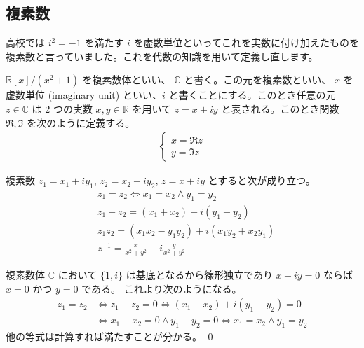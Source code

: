 \documentclass[uplatex,dvipdfmx,a4paper,11pt]{jlreq}
\makeatletter
\newcommand{\CC}{\mathbb{C}}
\newcommand{\RR}{\mathbb{R}}
\theoremstyle{definition}
\renewenvironment{proof}[1][\proofname]{\par
  \normalfont
  \topsep6\p@\@plus6\p@ \trivlist
  \item[\hskip\labelsep{\bfseries #1}\@addpunct{\bfseries}]\ignorespaces\quad\par
}{%
  \qed\endtrivlist\@endpefalse
}
\renewcommand\proofname{証明}
\makeatother
\begin{document}
\subsection{複素数}
高校では $i^2 = -1$ を満たす $i$ を虚数単位といってこれを実数に付け加えたものを複素数と言っていました。これを代数の知識を用いて定義し直します。

\begin{definition}
  $\RR[x]/(x^2 + 1)$ を複素数体といい、 $\CC$ と書く。この元を複素数といい、 $x$ を虚数単位 (imaginary unit) といい、$i$ と書くことにする。このとき任意の元 $z\in\CC$ は 2 つの実数 $x, y\in\RR$ を用いて $z = x + iy$ と表される。このとき関数 $\Re, \Im$ を次のように定義する。
  \begin{align}
    \begin{cases}
      x = \Re z \\
      y = \Im z
    \end{cases}
  \end{align}
\end{definition}

\begin{proposition}
  複素数 $z_1 = x_1 + iy_1$, $z_2 = x_2 + iy_2$, $z = x + iy$ とすると次が成り立つ。
  \begin{align}
     & z_1 = z_2 \iff x_1 = x_2 \land y_1 = y_2            \\
     & z_1 + z_2 = (x_1 + x_2) + i(y_1 + y_2)              \\
     & z_1z_2 = (x_1x_2 - y_1y_2) + i(x_1y_2 + x_2y_1)     \\
     & z^{-1} = \frac{x}{x^2 + y^2} - i\frac{y}{x^2 + y^2}
  \end{align}
\end{proposition}
\begin{proof}
  複素数体 $\CC$ において $\lbrace 1, i\rbrace$ は基底となるから線形独立であり $x + iy = 0$ ならば $x = 0$ かつ $y = 0$ である。
  これより次のようになる。
  \begin{align}
    z_1 = z_2 & \iff z_1 - z_2 = 0 \iff (x_1 - x_2) + i(y_1 - y_2) = 0                \\
              & \iff x_1 - x_2 = 0 \land y_1 - y_2 = 0 \iff x_1 = x_2 \land y_1 = y_2
  \end{align}
  他の等式は計算すれば満たすことが分かる。
\end{proof}
\end{document}
